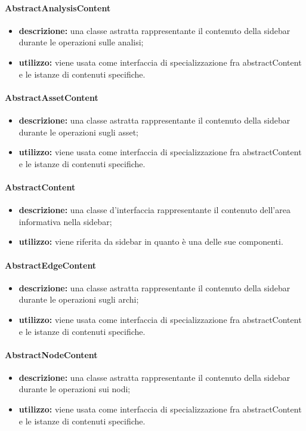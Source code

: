 \paragraph{AbstractAnalysisContent}
\begin{itemize}
	\item \textbf{descrizione:} una classe astratta rappresentante il contenuto della sidebar durante le operazioni sulle analisi;
	\item \textbf{utilizzo:} viene usata come interfaccia di specializzazione fra abstractContent e le istanze di contenuti specifiche.
\end{itemize}
\paragraph{AbstractAssetContent}
\begin{itemize}
	\item \textbf{descrizione:} una classe astratta rappresentante il contenuto della sidebar durante le operazioni sugli asset;
	\item \textbf{utilizzo:} viene usata come interfaccia di specializzazione fra abstractContent e le istanze di contenuti specifiche.
\end{itemize}
\paragraph{AbstractContent}
\begin{itemize}
	\item \textbf{descrizione:} una classe d'interfaccia rappresentante il contenuto dell'area informativa nella sidebar;
	\item \textbf{utilizzo:} viene riferita da sidebar in quanto è una delle sue componenti.
\end{itemize}
\paragraph{AbstractEdgeContent}
\begin{itemize}
	\item \textbf{descrizione:} una classe astratta rappresentante il contenuto della sidebar durante le operazioni sugli archi;
	\item \textbf{utilizzo:} viene usata come interfaccia di specializzazione fra abstractContent e le istanze di contenuti specifiche.
\end{itemize}
\paragraph{AbstractNodeContent}
\begin{itemize}
	\item \textbf{descrizione:} una classe astratta rappresentante il contenuto della sidebar durante le operazioni sui nodi;
	\item \textbf{utilizzo:} viene usata come interfaccia di specializzazione fra abstractContent e le istanze di contenuti specifiche.
\end{itemize}
